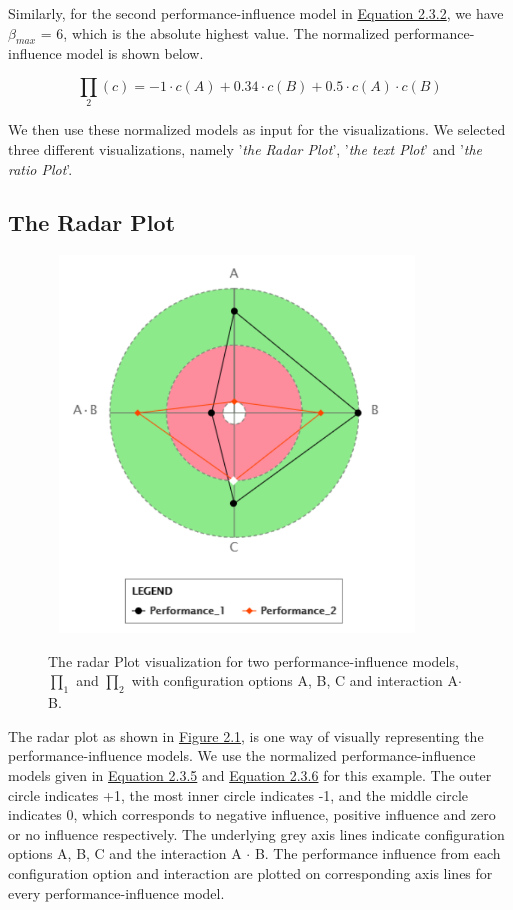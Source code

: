 Similarly, for the second performance-influence model in \hyperref[eq:2.3.2]{Equation 2.3.2}, we have $\beta_{max}$ = 6, which is the absolute highest value. The normalized performance-influence model is shown below.

\begin{equation*}
  \prod_2{(c)} = - 1 \cdot c(A) + 0.34 \cdot c(B) + 0.5 \cdot  c(A) \cdot c(B)
   \tag{2.3.6}\label{eq:2.3.6}
\end{equation*}

We then use these normalized models as input for the visualizations. We selected three different visualizations, namely '\textit{the Radar Plot}', '\textit{the text Plot}' and '\textit{the ratio Plot}'. 

\subsection{The Radar Plot}

\begin{figure}[ht]
\centering %
\label{radaPlot}
\includegraphics[width=10cm,height=10cm,keepaspectratio,]{pics/radar_plot.pdf}
\caption[The Radar Plot]{The radar Plot visualization for two performance-influence models, $\prod_1$ and $\prod_2$ with configuration options A, B, C and interaction A$\cdot$B.}
\end{figure}

The radar plot as shown in \hyperref[radaPlot]{Figure 2.1}, is one way of visually representing the performance-influence models. We use the normalized performance-influence models given in \hyperref[eq:2.3.5]{Equation 2.3.5} and \hyperref[eq:2.3.6]{Equation 2.3.6} for this example. The outer circle indicates +1, the most inner circle indicates -1, and the middle circle indicates 0, which corresponds to negative influence, positive influence and zero or no influence respectively. The underlying grey axis lines indicate configuration options A, B, C and the interaction A $\cdot$ B. The performance influence from each configuration option and interaction are plotted on corresponding axis lines for every performance-influence model.

